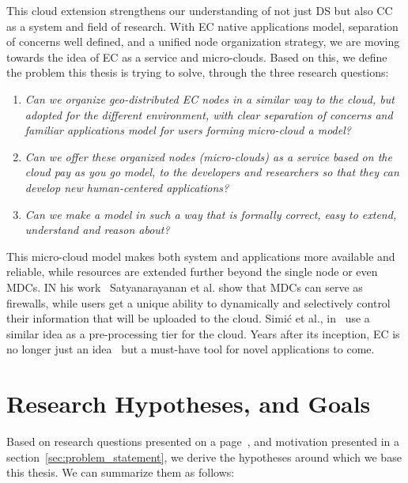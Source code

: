 This cloud extension strengthens our understanding of not just DS but also CC as a system and field of research. With EC native applications model, separation of concerns well defined, and a unified node organization strategy, we are moving towards the idea of EC as a service and micro-clouds. Based on this, we define the problem this thesis is trying to solve, through the three research questions:

\begin{enumerate}[start=1,label={(\bfseries \arabic*)}]\label{questions}
	\item \textit{Can we organize geo-distributed EC nodes in a similar way to the cloud, but adopted for the different environment, with clear separation of concerns and familiar applications model for users forming micro-cloud a model?}
	\item \textit{Can we offer these organized nodes (micro-clouds) as a service based on the cloud pay as you go model, to the developers and researchers so that they can develop new human-centered applications?}
	\item \textit{Can we make a model in such a way that is formally correct, easy to extend, understand and reason about?}
\end{enumerate}

\noindent
This micro-cloud model makes both system and applications more available and reliable, while resources are extended further beyond the single node or even MDCs. IN his work~\cite{SatyanarayananK19} Satyanarayanan et al. show that MDCs can serve as firewalls, while users get a unique ability to dynamically and selectively control their information that will be uploaded to the cloud.  Simi\' c et al., in~\cite{inproceedingsSimic1} use a similar idea as a pre-processing tier for the cloud. Years after its inception, EC is no longer just an idea~\cite{SatyanarayananK19} but a must-have tool for novel applications to come. 
%
%
\section{Research Hypotheses, and Goals}\label{sec:research_hyphotesis_and_golas}
%
Based on research questions presented on a page~\pageref{questions}, and motivation presented in a section~\ref{sec:problem_statement}, we derive the hypotheses around which we base this thesis. We can summarize them as follows:


